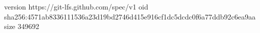 version https://git-lfs.github.com/spec/v1
oid sha256:4571ab8336111536a23d19bd2746d415e916cf1dc5dcdc0f6a77ddb92c6ea9aa
size 349692
